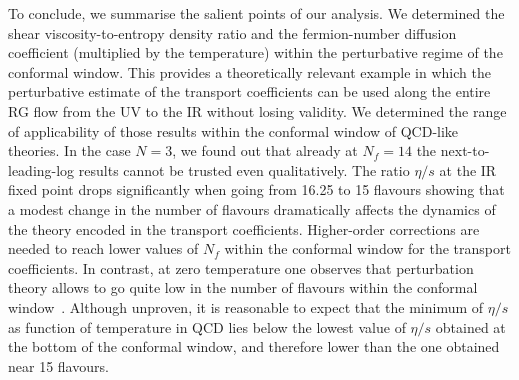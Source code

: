 To conclude, we summarise the salient points of our analysis. We determined the shear viscosity-to-entropy density ratio and the fermion-number diffusion coefficient (multiplied by the temperature) within the perturbative regime of the conformal window. This provides a theoretically relevant example in which the perturbative estimate of the transport coefficients can be used along the entire RG flow from the UV to the IR without losing validity. We determined the range of applicability of those results within the conformal window of QCD-like theories. In the case $N=3$, we found out that already at $N_f=14$ the next-to-leading-log results cannot be trusted even qualitatively. The ratio $\eta/s$ at the IR fixed point drops significantly when going from 16.25 to 15 flavours showing that a modest change in the number of flavours dramatically affects the dynamics of the theory encoded in the transport coefficients. Higher-order corrections are needed to reach lower values of $N_f$ within the conformal window for the transport coefficients. In contrast, at zero temperature one observes that perturbation theory allows to go quite low in the number of flavours within the conformal window~\cite{Pica:2010mt,Pica:2010xq,Ryttov:2010iz,Ryttov:2016ner}. Although unproven, it is reasonable to expect that the minimum of $\eta/s$ as function of temperature in QCD lies below the lowest value of $\eta/s$ obtained at the bottom of the conformal window, and therefore lower than the one obtained near 15 flavours. 



